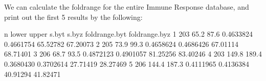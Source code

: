 \documentclass{article}[12pt]
\begin{document}
We can calculate the foldrange for the entire Immune Response database, and print out the first 5 results by the following: 
\begin{Schunk}
\begin{Soutput}
    n lower upper     s.byt     s.byz foldrange.byt foldrange.byz
1 203  65.2  87.6 0.4633824 0.4661754      65.52782      67.20073
2 205  73.9  99.3 0.4658624 0.4686426      67.01114      68.71401
3 206  68.7  93.5 0.4872123 0.4901057      81.25256      83.40246
4 203 149.8 189.4 0.3680430 0.3702614      27.71419      28.27469
5 206 144.4 187.3 0.4111965 0.4136384      40.91294      41.82471
\end{Soutput}
\end{Schunk}
\end{document}
